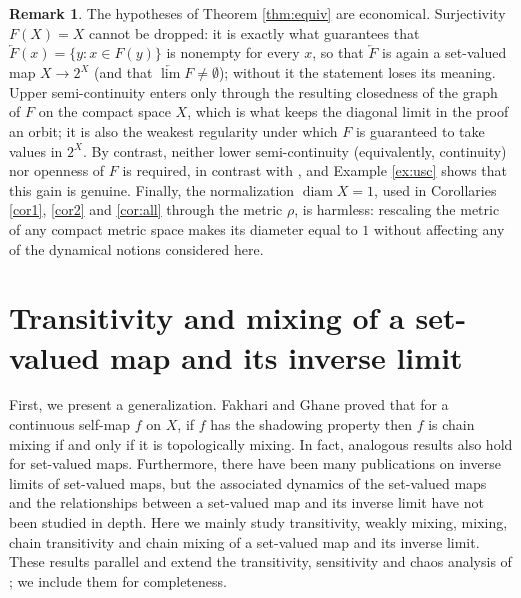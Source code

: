 \documentclass[12pt]{amsart}
\theoremstyle{definition}
\newtheorem{remark}[theorem]{Remark}
\begin{document}
\begin{remark}\label{rem:hypotheses}
	The hypotheses of Theorem \ref{thm:equiv} are economical. Surjectivity $F(X)=X$ cannot be dropped: it is exactly what guarantees that $\underleftarrow{F}(x)=\{y:x\in F(y)\}$ is nonempty for every $x$, so that $\underleftarrow{F}$ is again a set-valued map $X\rightarrow 2^X$ (and that $\underleftarrow{\lim} F\neq\emptyset$); without it the statement loses its meaning. Upper semi-continuity enters only through the resulting closedness of the graph of $F$ on the compact space $X$, which is what keeps the diagonal limit in the proof an orbit; it is also the weakest regularity under which $F$ is guaranteed to take values in $2^X$. By contrast, neither lower semi-continuity (equivalently, continuity) nor openness of $F$ is required, in contrast with \cite{KhanKumarDas}, and Example \ref{ex:usc} shows that this gain is genuine. Finally, the normalization $\operatorname{diam}X=1$, used in Corollaries \ref{cor1}, \ref{cor2} and \ref{cor:all} through the metric $\rho$, is harmless: rescaling the metric of any compact metric space makes its diameter equal to $1$ without affecting any of the dynamical notions considered here.
\end{remark}
\section{Transitivity and mixing of a set-valued map and its inverse limit}\label{sectran}
First, we present a generalization. Fakhari and Ghane\cite{Fakhari2010} proved that for a continuous self-map $f$ on $X$, if $f$ has the shadowing property then $f$ is chain mixing if and only if it is topologically mixing. In fact, analogous results also hold for set-valued maps. Furthermore, there have been many publications on inverse limits of set-valued maps, but the associated dynamics of the set-valued maps and the relationships between a set-valued map and its inverse limit have not been studied in depth. Here we mainly study transitivity, weakly mixing, mixing, chain transitivity and chain mixing of a set-valued map and its inverse limit. These results parallel and extend the transitivity, sensitivity and chaos analysis of \cite{zhao2023}; we include them for completeness.
\end{document}
